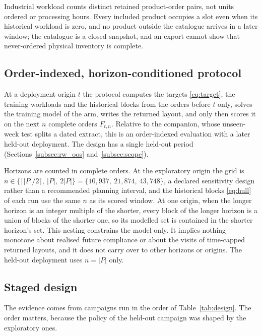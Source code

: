 Industrial workload counts distinct retained product-order pairs, not units ordered or processing hours. Every included product occupies a slot even when its historical workload is zero, and no product outside the catalogue arrives in a later window; the catalogue is a closed snapshot, and an export cannot show that never-ordered physical inventory is complete.

\subsection{Order-indexed, horizon-conditioned protocol}\label{subsec:orderprotocol}
At a deployment origin $t$ the protocol computes the targets \eqref{eq:target}, the training workloads and the historical blocks from the orders before $t$ only, solves the training model of the arm, writes the returned layout, and only then scores it on the next $n$ complete orders $F_{t,n}$. Relative to the companion, whose unseen-week test splits a dated extract, this is an order-indexed evaluation with a later held-out deployment. The design has a single held-out period (Sections~\ref{subsec:rw_oos} and~\ref{subsec:scope}).

Horizons are counted in complete orders. At the exploratory origin the grid is $n\in\{\lceil|P|/2\rceil,\ |P|,\ 2|P|\}=\{10{,}937,\ 21{,}874,\ 43{,}748\}$, a declared sensitivity design rather than a recommended planning interval, and the historical blocks \eqref{eq:hull} of each run use the same $n$ as its scored window. At one origin, when the longer horizon is an integer multiple of the shorter, every block of the longer horizon is a union of blocks of the shorter one, so its modelled set is contained in the shorter horizon's set. This nesting constrains the model only. It implies nothing monotone about realised future compliance or about the visits of time-capped returned layouts, and it does not carry over to other horizons or origins. The held-out deployment uses $n=|P|$ only.

\subsection{Staged design}\label{subsec:stages}
The evidence comes from campaigns run in the order of Table~\ref{tab:design}. The order matters, because the policy of the held-out campaign was shaped by the exploratory ones.

